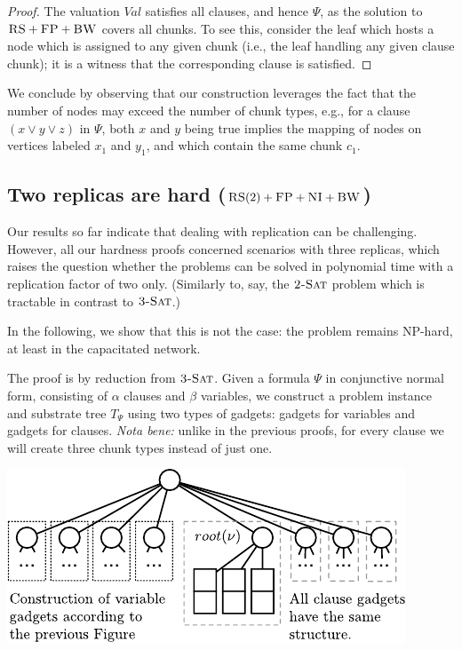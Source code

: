 \documentclass[9pt]{sigcomm-alternate}
\newcommand{\clauses}{\alpha}
\newcommand{\vars}{\beta}
\newcommand{\CC}{\textsc{NI}}
\newcommand{\FP}{\textsc{FP}}
\newcommand{\RS}{\textsc{RS}}
\newcommand{\BW}{\textsc{BW}}
\newcommand{\TSAT}{\textsc{3-Sat}}
\newcommand{\ZSAT}{\textsc{2-Sat}}
\newcommand{\Formula}{\ensuremath{\Psi}}
\newcommand{\Val}{\ensuremath{Val}}
\begin{document}
\begin{appendix}
\begin{proof}
The valuation $\Val$ satisfies all clauses, and hence $\Formula$,
as the solution to $\RS+\FP+\BW$ covers all chunks. To see this,
consider the leaf which
hosts a node which is assigned to any given chunk (i.e.,
the leaf handling any given clause chunk);
it is a witness that the corresponding clause is satisfied.
\end{proof}

We conclude by observing that our construction leverages the fact that
the number of nodes may exceed the number of chunk types, e.g.,
for a clause $(x \vee y \vee z)$ in
$\Formula$, both $x$ and $y$ being true implies the
mapping of nodes on vertices labeled $x_1$ and $y_1$, and which contain the
same chunk $c_1$.


\subsection{Two replicas are hard
  ($\RS(2)+\FP+\CC+\BW$)}\label{ssec:two}

Our results so far indicate that dealing with replication can be challenging.
However, all our hardness proofs concerned scenarios with three replicas,
which raises the question whether the problems can be solved in polynomial time
with a replication factor of two only. (Similarly to, say, the $\ZSAT$ problem
which is tractable in contrast to $\TSAT$.)

In the following, we show that this is not the case: the problem remains
NP-hard, at least in the capacitated network.

The proof is by reduction from $\TSAT$. Given a formula $\Formula$ in
conjunctive normal form, consisting of $\clauses$ clauses and $\vars$ variables, we construct a problem instance and substrate tree
$T_{\Formula}$ using two types of gadgets: gadgets for variables and
gadgets for clauses. \emph{Nota bene:}
unlike in the previous proofs, for every clause we will create three chunk types instead of just one.

\includegraphics{figs/construction_2replica}


\end{appendix}
\end{document}
